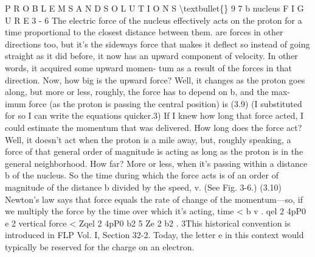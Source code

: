 \documentclass[10pt,oneside]{article}
\begin{document}
P R O B L E M S  A N D  S O L U T I O N S \textbackslash{}textbullet\{\} 9 7 b nucleus F I G U R E  3 - 6 The electric force of the nucleus effectively acts on the proton for a time proportional to the closest distance between them. are forces in other directions too, but it’s the sideways force that makes it deflect so instead of going straight as it did before, it now has an upward component of velocity. In other words, it acquired some upward momen- tum as a result of the forces in that direction. Now, how big is the upward force? Well, it changes as the proton goes along, but more or less, roughly, the force has to depend on b, and the max- imum force (as the proton is passing the central position) is (3.9) (I substituted for so I can write the equations quicker.3) If I knew how long that force acted, I could estimate the momentum that was delivered. How long does the force act? Well, it doesn’t act when the proton is a mile away, but, roughly speaking, a force of that general order of magnitude is acting as long as the proton is in the general neighborhood. How far? More or less, when it’s passing within a distance b of the nucleus. So the time during which the force acts is of an order of magnitude of the distance b divided by the speed, v. (See Fig. 3-6.) (3.10) Newton’s law says that force equals the rate of change of the momentum---so, if we multiply the force by the time over which it’s acting, time < b v . qel 2 4pP0 e 2 vertical force < Zqel 2 4pP0 b2 5 Ze 2 b2 . 3This historical convention is introduced in FLP Vol. I, Section 32-2. Today, the letter e in this context would typically be reserved for the charge on an electron.\par
\end{document}
